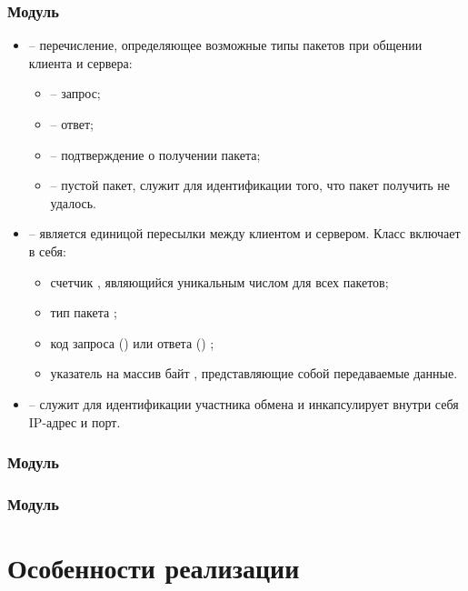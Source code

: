 \subsubsection{Модуль }

\begin{itemize}
		\item {} -- перечисление, определяющее возможные типы пакетов при общении клиента и сервера:
	\begin{itemize}
		\item {} -- запрос;
		\item {} -- ответ;
		\item {} -- подтверждение о получении пакета;
		\item {} -- пустой пакет, служит для идентификации того, что пакет получить не удалось.
	\end{itemize}
	\item {} -- является единицой пересылки между клиентом и сервером. Класс включает в себя:
	\begin{itemize}
		\item счетчик , являющийся уникальным числом для всех пакетов;
		\item тип пакета ;
		\item код запроса () или ответа () ;
		\item указатель на массив байт , представляющие собой передаваемые данные.
	\end{itemize}
	\item {} -- служит для идентификации участника обмена и инкапсулирует внутри себя IP-адрес и порт. 
\end{itemize}

\subsubsection{Модуль }

\subsubsection{Модуль }

\section{Особенности реализации}

